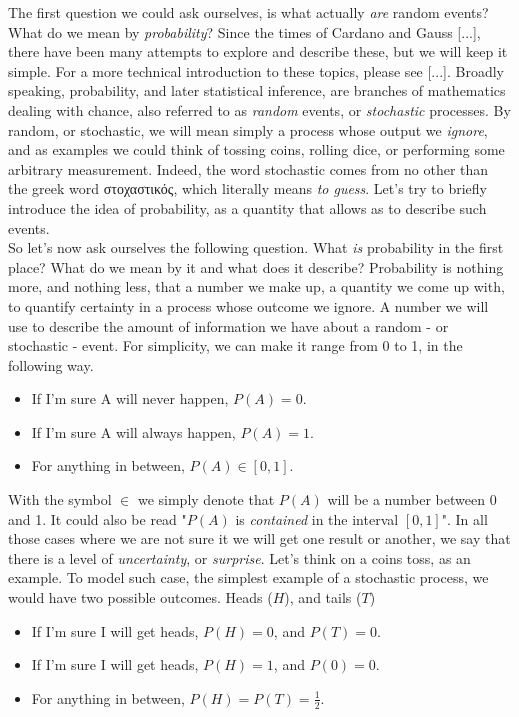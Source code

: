 \documentclass{book}
\begin{document}
The first question we could ask ourselves, is what actually \textit{are} random events? What do we mean by \textit{probability}? Since the times of Cardano and Gauss [...], there have been many attempts to explore and describe these, but we will keep it simple. For a more technical introduction to these topics, please see [...]. Broadly speaking, probability, and later statistical inference, are branches of mathematics dealing with chance, also referred to as \textit{random} events, or \textit{stochastic} processes. By random, or stochastic, we will mean simply a process whose output we \textit{ignore}, and as examples we could think of tossing coins, rolling dice, or performing some arbitrary measurement. Indeed, the word stochastic comes from no other than the greek word \textgreek{στοχαστικός}, which literally means \textit{to guess}. Let's try to briefly introduce the idea of probability, as a quantity that allows as to describe such events.\\

So let's now ask ourselves the following question. What \textit{is} probability in the first place? What do we mean by it and what does it describe? Probability is nothing more, and nothing less, that a number we make up, a quantity we come up with, to quantify certainty in a process whose outcome we ignore. A number we will use to describe the amount of information we have about a random - or stochastic - event. For simplicity, we can make it range from 0 to 1, in the following way.

\begin{itemize}
\item If I'm sure A will never happen, $P(A) = 0$.
\item If I'm sure A will always happen,  $P(A) = 1$.
\item For anything in between, $P(A) \in [0, 1]$.
\end{itemize}

With the symbol $ \in$ we simply denote that $P(A)$ will be a number between 0 and 1. It could also be read "$P(A)$ is \textit{contained} in the interval $[0, 1]$". In all those cases where we are not sure it we will get one result or another, we say that there is a level of \textit{uncertainty}, or \textit{surprise}. Let's think on a coins toss, as an example. To model such case, the simplest example of a stochastic process, we would have two possible outcomes. Heads ($H$), and tails ($T$)

\begin{itemize}
\item If I'm sure I will get heads, $P(H) = 0$, and $P(T) = 0$.
\item If I'm sure I will get heads, $P(H) = 1$, and $P(0) = 0$.
\item For anything in between, $P(H) = P(T) = \frac{1}{2}$.
\end{itemize}
\end{document}
